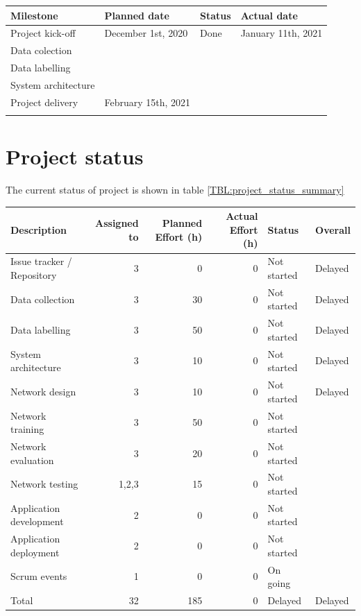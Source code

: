 \documentclass{article}
\begin{document}
\begin{center}
\begin{tabular}{llll}
Milestone & Planned date & Status & Actual date\\
\hline
Project kick-off & December 1st, 2020 & Done & January 11th, 2021\\
Data colection &  &  & \\
Data labelling &  &  & \\
System architecture &  &  & \\
Project delivery & February 15th, 2021 &  & \\
 &  &  & \\
\end{tabular}
\end{center}

\section{Project status}
\label{sec:orgb2dc9e3}
The current status of project is shown in table \ref{TBL:project_status_summary} 

\begin{center}
\begin{tabular}{lrrrll}
Description & Assigned to & Planned Effort (h) & Actual Effort (h) & Status & Overall\\
\hline
Issue tracker / Repository & 3 & 0 & 0 & Not started & Delayed\\
Data collection & 3 & 30 & 0 & Not started & Delayed\\
Data labelling & 3 & 50 & 0 & Not started & Delayed\\
System architecture & 3 & 10 & 0 & Not started & Delayed\\
Network design & 3 & 10 & 0 & Not started & Delayed\\
Network training & 3 & 50 & 0 & Not started & \\
Network evaluation & 3 & 20 & 0 & Not started & \\
Network testing & 1,2,3 & 15 & 0 & Not started & \\
Application development & 2 & 0 & 0 & Not started & \\
Application deployment & 2 & 0 & 0 & Not started & \\
Scrum events & 1 & 0 & 0 & On going & \\
\hline
Total & 32 & 185 & 0 & Delayed & Delayed\\
\end{tabular}
\end{center}
\end{document}
